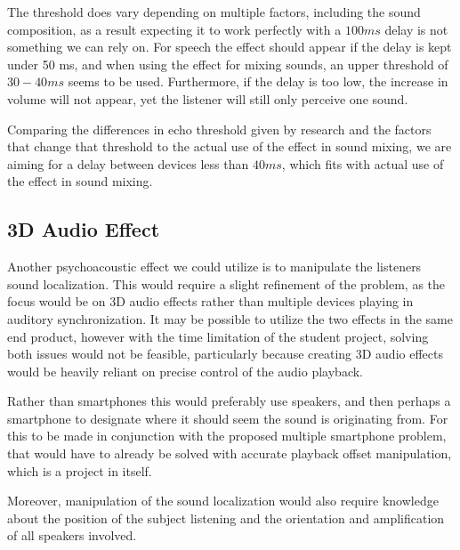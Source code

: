 The threshold does vary depending on multiple factors, including the sound composition, as a result expecting it to work perfectly with a $100 ms$ delay is not something we can rely on.
For speech the effect should appear if the delay is kept under 50 ms, and when using the effect for mixing sounds, an upper threshold of $30 - 40 ms$ seems to be used.
Furthermore, if the delay is too low, the increase in volume will not appear, yet the listener will still only perceive one sound.\cite{useprecedence1, useprecedence2, useprecedence3}

Comparing the differences in echo threshold given by research and the factors that change that threshold to the actual use of the effect in sound mixing, we are aiming for a delay between devices less than $40 ms$, which fits with actual use of the effect in sound mixing.

\subsection{3D Audio Effect}
Another psychoacoustic effect we could utilize is to manipulate the listeners sound localization.
This would require a slight refinement of the problem, as the focus would be on 3D audio effects rather than multiple devices playing in auditory synchronization.
It may be possible to utilize the two effects in the same end product, however with the time limitation of the student project, solving both issues would not be feasible, particularly because creating 3D audio effects would be heavily reliant on precise control of the audio playback.

Rather than smartphones this would preferably use speakers, and then perhaps a smartphone to designate where it should seem the sound is originating from.
For this to be made in conjunction with the proposed multiple smartphone problem, that would have to already be solved with accurate playback offset manipulation, which is a project in itself.

Moreover, manipulation of the sound localization would also require knowledge about the position of the subject listening and the orientation and amplification of all speakers involved.

